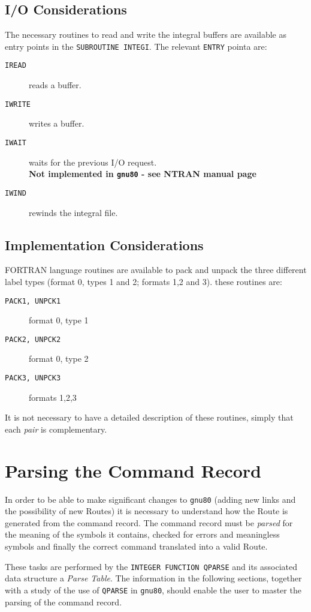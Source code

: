 \subsection{\sf I/O Considerations}
The necessary routines to read and write the integral buffers are
available as entry points in the {\tt SUBROUTINE INTEGI}.
The relevant {\tt ENTRY} pointa are:
\begin{description}
\item[\tt IREAD] reads a buffer.
\item[\tt IWRITE] writes a buffer.
\item[\tt IWAIT] waits for the previous I/O request. \\
{\bf Not implemented in {\tt gnu80} - see NTRAN manual page}
\item[\tt IWIND] rewinds the integral file.
\end{description}
\subsection{\sf Implementation Considerations}
FORTRAN language routines are available to pack and unpack the
three different label types (format 0, types 1 and 2; formats 1,2 and
3).   these routines are:
\begin{description}
\item[\tt PACK1, UNPCK1] format 0, type 1
\item[\tt PACK2, UNPCK2] format 0, type 2
\item[\tt PACK3, UNPCK3] formats 1,2,3
\end{description}
It is not necessary to have a detailed description of these
routines, simply that each {\em pair} is complementary.
\section{\sf Parsing the Command Record}
In order to be able to make significant changes to {\tt gnu80} (adding new
links and the possibility of new Routes) it is necessary to
understand how the Route is generated from the command record.
The command record must be {\em parsed} for the meaning of the
symbols it contains, checked for errors and meaningless symbols
and finally the correct command translated into a valid Route.

These tasks are performed by the {\tt INTEGER FUNCTION QPARSE} and its
associated data structure a {\em Parse Table}. The information
in the following sections, together with a study of the use of
{\tt QPARSE} in {\tt gnu80}, should enable the user to master the
parsing of the command record.
